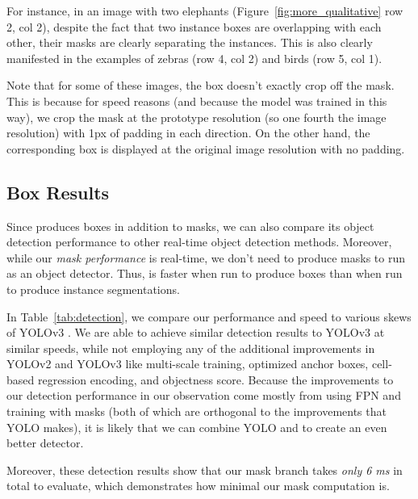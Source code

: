 \documentclass[10pt,journal,compsoc]{IEEEtran}
\begin{document}
    For instance, in an image with two elephants (Figure~\ref{fig:more_qualitative} row 2, col 2), despite the fact that two instance boxes are overlapping with each other, their masks are clearly separating the instances. This is also clearly manifested in the examples of zebras (row 4, col 2) and birds (row 5, col 1). 
    
    Note that for some of these images, the box doesn't exactly crop off the mask. This is because for speed reasons (and because the model was trained in this way), we crop the mask at the prototype resolution (so one fourth the image resolution) with 1px of padding in each direction. On the other hand, the corresponding box is displayed at the original image resolution with no padding.

    
\subsection{Box Results}
    Since \methodname{} produces boxes in addition to masks, we can also compare its object detection performance to other real-time object detection methods. Moreover, while our \textit{mask performance} is real-time, we don't need to produce masks to run \methodname{} as an object detector. Thus, \methodname{} is faster when run to produce boxes than when run to produce instance segmentations. 
    
    In Table~\ref{tab:detection}, we compare our performance and speed to various skews of YOLOv3 \cite{yolov3}.  We are able to achieve similar detection results to YOLOv3 at similar speeds, while not employing any of the additional improvements in YOLOv2 and YOLOv3 like multi-scale training, optimized anchor boxes, cell-based regression encoding, and objectness score. Because the improvements to our detection performance in our observation come mostly from using FPN and training with masks (both of which are orthogonal to the improvements that YOLO makes), it is likely that we can combine YOLO and \methodname{} to create an even better detector.

    Moreover, these detection results show that our mask branch takes \emph{only 6 ms} in total to evaluate, which demonstrates how minimal our mask computation is.
\end{document}
